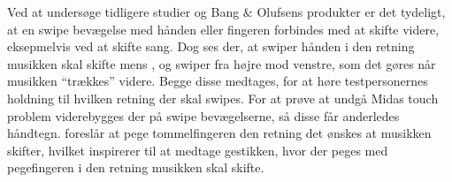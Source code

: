 Ved at undersøge tidligere studier og Bang $\&$ Olufsens produkter er det tydeligt, at en swipe bevægelse med hånden eller fingeren forbindes med at skifte videre, eksepmelvis ved at skifte sang. Dog ses der, at \textcite[s. 166]{PDF:ComparingInputModalities} swiper hånden i den retning musikken skal skifte mens \textcite[s. 48]{PDF:UserDefinedGesturesTV}, \textcite{WEB:Beosound2} og \textcite{WEB:BeosoundMoment} swiper fra højre mod venstre, som det gøres når musikken \enquote{trækkes} videre. Begge disse medtages, for at høre testpersonernes holdning til hvilken retning der skal swipes. For at prøve at undgå Midas touch problem viderebygges der på swipe bevægelserne, så disse får anderledes håndtegn. \textcite[s. 166]{PDF:ComparingInputModalities} foreslår at pege tommelfingeren den retning det ønskes at musikken skifter, hvilket inspirerer til at medtage gestikken, hvor der peges med pegefingeren i den retning musikken skal skifte. 

